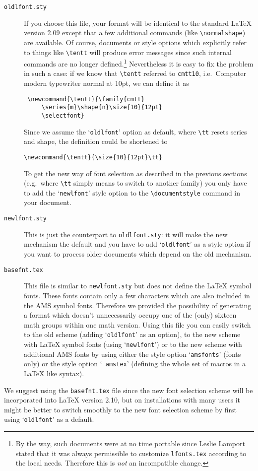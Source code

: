 \begin{description}
 \item[{\tt oldlfont.sty}]
    If you choose this file, your format will be identical to the
     standard \LaTeX{} version 2.09 except that a few additional
     commands (like \verb+\normalshape+) are available.  Of course,
     documents or style options which explicitly refer to things like
     \verb+\tentt+ will produce error messages since such internal
     commands are no longer defined.\footnote{By the way, such
     documents were at no time portable since Leslie Lamport stated
     that it was always permissible to customize {\tt lfonts.tex}
     according to the local needs. Therefore this is {\em not\/} an
     incompatible change.} Nevertheless it is easy to fix the
     problem in such a case: if we know that \verb+\tentt+ referred to
     {\tt cmtt10}, i.e.\ Computer modern typewriter normal at 10pt,
     we can define it as
    \begin{verbatim}
 \newcommand{\tentt}{\family{cmtt}
     \series{m}\shape{n}\size{10}{12pt}
     \selectfont}
\end{verbatim}
    Since we assume the `{\tt oldlfont}' option as default, where
     \verb+\tt+ resets series and shape, the definition could be
     shortened to
    \begin{verbatim}
\newcommand{\tentt}{\size{10}{12pt}\tt}
\end{verbatim}
    To get the new way of font selection as described in the previous
     sections (e.g.\ where \verb+\tt+ simply means to switch to another
     family) you only have to add the `{\tt newlfont}' style option to
     the \verb+\documentstyle+ command in your document.

  \item[\tt newlfont.sty]
    This is just the counterpart to {\tt oldlfont.sty}: it will make
     the new mechanism the default and you have to add `{\tt oldlfont}'
     as a style option if you want to process older documents which
     depend on the old mechanism.

  \item[\tt basefnt.tex]
    This file is similar to {\tt newlfont.sty} but does not define the
     \LaTeX{} symbol fonts. These fonts contain only a few characters
     which are also included in the AMS symbol fonts.  Therefore we
     provided the possibility of generating a format which doesn't
     unnecessarily occupy one of the (only) sixteen math groups within
     one math version. Using this file you can easily switch to the
     old scheme (adding `{\tt oldlfont}' as an option), to the new
     scheme with \LaTeX{} symbol fonts (using `{\tt newlfont}') or to
     the new scheme with additional AMS fonts by using either the
     style option `{\tt amsfonts}' (fonts only) or the style option `{\tt
     amstex}' (defining the whole set of \AmSTeX{} macros in a \LaTeX{}
     like syntax).
 \end{description}
We suggest using the {\tt basefnt.tex} file since the new font
 selection scheme will be incorporated into \LaTeX{} version 2.10, but
 on installations with many users it might be better to switch
 smoothly to the new font
 selection scheme by first using `{\tt oldlfont}' as a default.

